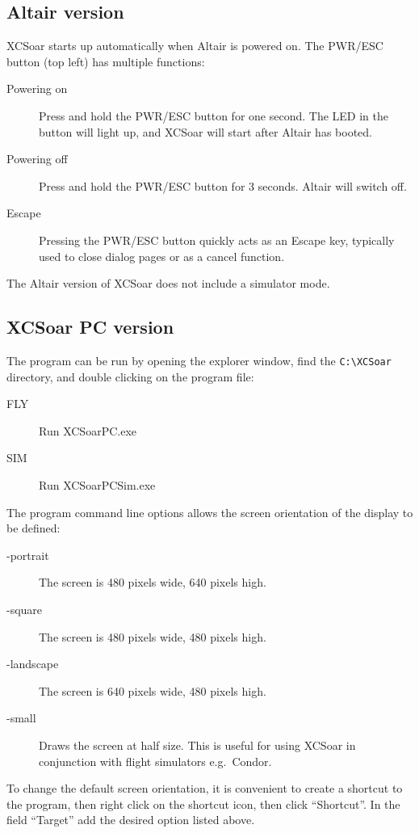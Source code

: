 \documentclass[a4paper,12pt]{refrep}
\begin{document}
\subsection*{Altair version}
XCSoar starts up automatically when Altair is powered on.
The PWR/ESC button (top left) has multiple functions:
\begin{description}
\item[Powering on]  Press and hold the PWR/ESC button for one second.
  The LED in the button will light up, and XCSoar will start after
  Altair has booted.
\item[Powering off]  Press and hold the PWR/ESC button for 3 seconds.
  Altair will switch off.
\item[Escape] Pressing the PWR/ESC button quickly acts as an
Escape key, typically used to close dialog pages or as a cancel function.
\end{description}

The Altair version of XCSoar does not include a simulator mode.

\subsection*{XCSoar PC version}
The program can be run by opening the explorer window, find the
\verb|C:\XCSoar| directory, and double clicking on the program file:
\begin{description}
\item[FLY] Run XCSoarPC.exe 
\item[SIM] Run XCSoarPCSim.exe
\end{description}

The program command line options allows the screen orientation of
the display to be defined:
\begin{description}
\item[-portrait] The screen is 480 pixels wide, 640 pixels high.
\item[-square] The screen is 480 pixels wide, 480 pixels high.
\item[-landscape] The screen is 640 pixels wide, 480 pixels high.
\item[-small] Draws the screen at half size.  This is useful for using XCSoar in
 conjunction with flight simulators e.g.\ Condor.
\end{description}
To change the default screen orientation, it is convenient to create a
shortcut to the program, then right click on the shortcut icon, then
click ``Shortcut''.  In the field ``Target'' add the desired option
listed above.
\end{document}
